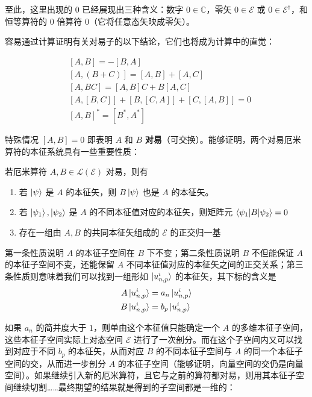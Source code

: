 \documentclass[cn,10pt,math=newtx,citestyle=gb7714-2015,bibstyle=gb7714-2015]{elegantbook}
\def\ms{\mathscr}
\def\mc{\mathcal}
\def\C{\mathbb C}
\def\dg{\dagger}
\begin{document}
\begin{remark}
至此，这里出现的 0 已经展现出三种含义：数字 $0\in\C$，零矢 $0\in\ms E$ 或 $0\in\ms E^\dg$，和恒等算符的 0 倍算符 $0$（它将任意态矢映成零矢）。
\end{remark}

容易通过计算证明有关对易子的以下结论，它们也将成为计算中的直觉：
\begin{theorem}[对易子的基本代数性质]\label{thm:cmmttr_algbr_prprt}
\begin{align}
    & [A,B] = -[B,A]\\
    & [A,(B+C)] = [A,B]+[A,C]\\
    & [A,BC] = [A,B]C + B[A,C]\\
    & [A,[B,C]]+[B,[C,A]]+[C,[A,B]]=0\\
    & [A,B]^*=[B^*,A^*]
\end{align}
\end{theorem}

特殊情况 $[A,B]=0$ 即表明 $A$ 和 $B$ \textbf{对易}（可交换）。能够证明，两个对易厄米算符的本征系统具有一些重要性质：

\begin{theorem}[对易厄米算符的本征系统]\label{thm:commutableHermite}
若厄米算符 $A,B\in\mc L(\ms E)$ 对易，则有
\begin{enumerate}
    \item 若 $\ket{\psi}$ 是 $A$ 的本征矢，则 $B\ket{\psi}$ 也是 $A$ 的本征矢。
    \item 若 $\ket{\psi_1},\ket{\psi_2}$ 是 $A$ 的不同本征值对应的本征矢，则矩阵元 $\braket{\psi_1|B|\psi_2}=0$
    \item 存在一组由 $A,B$ 的共同本征矢组成的 $\ms E$ 的正交归一基
\end{enumerate}
\end{theorem}

第一条性质说明 $A$ 的本征子空间在 $B$ 下不变；第二条性质说明 $B$ 不但能保证 $A$ 的本征子空间不变，还能保留 $A$ 不同本征值对应的本征矢之间的正交关系；第三条性质则意味着我们可以找到一组形如 $\ket{u_{n,p}^i}$ 的本征矢，其下标的含义是
\begin{align*}
    A\ket{u_{n,p}^i}&=a_n\ket{u_{n,p}^i}\\
    B\ket{u_{n,p}^i}&=b_p\ket{u_{n,p}^i}
\end{align*}

如果 $a_n$ 的简并度大于 $1$，则单由这个本征值只能确定一个 $A$ 的多维本征子空间，这些本征子空间实际上对态空间 $\ms E$ 进行了一次剖分。而在这个子空间内又可以找到对应于不同 $b_p$ 的本征矢，从而对应 $B$ 的不同本征子空间与 $A$ 的同一个本征子空间的交，从而进一步剖分 $A$ 的本征子空间（能够证明，向量空间的交仍是向量空间）。如果继续引入新的厄米算符，且它与之前的算符都对易，则用其本征子空间继续切割……最终期望的结果就是得到的子空间都是一维的：
\end{document}

